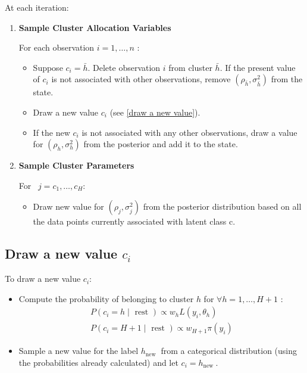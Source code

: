 \documentclass[12pt,a4paper]{article}
\begin{document}
At each iteration:
\begin{enumerate}
\item \textbf{Sample Cluster Allocation Variables}

{\small For each observation $i=1, \ldots, n$ :}
\begin{itemize}
\item Suppose $c_{i}=\bar{h}$. Delete observation $i$ from cluster $\bar{h}$.
If the present value of $c_{i}$ is not associated with other observations, remove $\left(\rho_{\bar{h}}, \sigma_{\bar{h}}^{2}\right)$ from the state.
\item Draw a new value $c_{i}$ (see \autoref{draw a new value}).
\item If the new $c_{i}$ is not associated with any other observations, draw a value for $\left(\rho_{h}, \sigma_{h}^{2}\right)$ from the posterior and add it to the state.\\
\end{itemize}

\item \textbf{Sample Cluster Parameters}

{\small For \ $j= c_{1}, \ldots, c_{H}$:}
\begin{itemize}
  \item Draw new value for $\left(\rho_{j}, \sigma_{j}^{2}\right)$ from the posterior distribution based on all the data points currently associated with latent class c.
\end{itemize}
\end{enumerate}

\subsection{Draw a new value $c_{i}$}
\label{draw a new value}

To draw a new value $c_{i}$:

\begin{itemize}
  \item Compute the probability of belonging to cluster $h$ for $\forall h=1, \ldots, H+1$ :
$$
\begin{gathered}
P\left(c_{i}=h \mid \text { rest }\right) \propto w_{h} L\left(y_{i}, \theta_{h}\right) \\
P\left(c_{i}=H+1 \mid \text { rest }\right) \propto w_{H+1} \pi\left(y_{i}\right)
\end{gathered}
$$
  \item Sample a new value for the label $h_{\text {new }}$ from a categorical distribution (using the probabilities already calculated) and let $c_{i}=h_{\text {new }}$.\\
\end{itemize}
\end{document}
